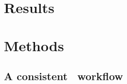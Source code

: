 \begin{comment}
\subsection{Expression within a sample}\KOMAoptions{parskip=half*}\label{subsec:exprTrans}
It is a little trickier as we have to account for technical noise,
but we can also expect ``translational noise'' \citep{rnaseq-2009},
\citep{lowNoiseLimit}.
While we can empirically evaluate it for each dataset \citep{ramskoldan:2009},
there is a widespread (arbitrary) threshold used in the literature:
1 \gls{FPKM} (or \gls{RPKM}).
I have used this threshold to run (at least once) all the analyses since
many datasets are enriched for \mRNAs. Moreover, the \Cref{ch:Integration}
focus is the comparison of proteomic and
transcriptomic data. In fact,~\citet{Hebenstreit:2011} showed in
their study \paper{\citetitle{Hebenstreit:2011}},
that to be translated into a protein, a \mRNA\ should
present an expression at least equals to 1 \gls{RPKM}.

It is worth mentioning that parts of the analyses have also been done without
any threshold or with a threshold of $5$ \glspl{FPKM}.

\subsection{Limitation of the study}
While I have compared the list of undefined, expressed and unexpressed \mRNAs\
through the five datasets, the bulk of the analysis has been done on the common
\mRNAs.

In other words, if a \mRNA\ is not expressed in at least one sample in \emph{each}
dataset used for the study, it will be excluded from the main part of the
analysis workflow.

\end{comment}

\section{Results}\label{sec:Trans_Results}
\section{Methods}
\subsection{A consistent \Rnaseq\ workflow}

